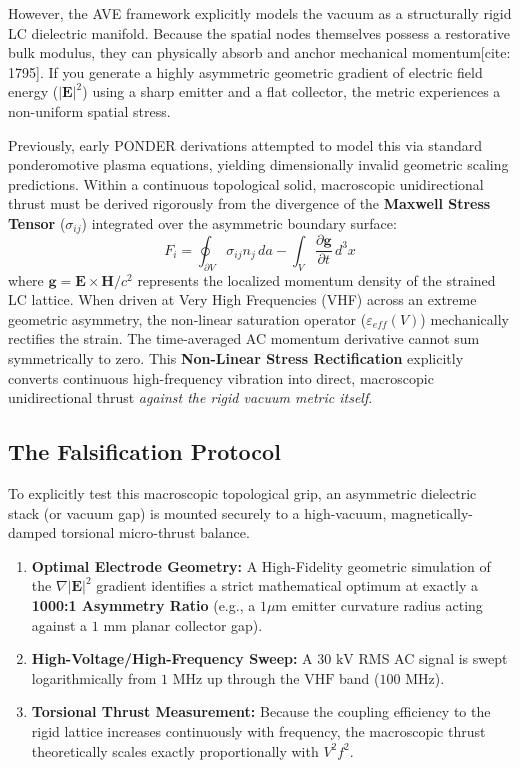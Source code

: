 However, the AVE framework explicitly models the vacuum as a structurally rigid LC dielectric manifold. Because the spatial nodes themselves possess a restorative bulk modulus, they can physically absorb and anchor mechanical momentum[cite: 1795]. If you generate a highly asymmetric geometric gradient of electric field energy ($|\mathbf{E}|^2$) using a sharp emitter and a flat collector, the metric experiences a non-uniform spatial stress.

Previously, early PONDER derivations attempted to model this via standard ponderomotive plasma equations, yielding dimensionally invalid geometric scaling predictions. Within a continuous topological solid, macroscopic unidirectional thrust must be derived rigorously from the divergence of the \textbf{Maxwell Stress Tensor} ($\sigma_{ij}$) integrated over the asymmetric boundary surface:
\begin{equation}
    F_i = \oint_{\partial V} \sigma_{ij} n_j \, da - \int_V \frac{\partial \mathbf{g}}{\partial t} \, d^3x
\end{equation}
where $\mathbf{g} = \mathbf{E} \times \mathbf{H} / c^2$ represents the localized momentum density of the strained LC lattice. When driven at Very High Frequencies (VHF) across an extreme geometric asymmetry, the non-linear saturation operator ($\varepsilon_{eff}(V)$) mechanically rectifies the strain. The time-averaged AC momentum derivative cannot sum symmetrically to zero. This \textbf{Non-Linear Stress Rectification} explicitly converts continuous high-frequency vibration into direct, macroscopic unidirectional thrust \textit{against the rigid vacuum metric itself}.

\subsection{The Falsification Protocol}
To explicitly test this macroscopic topological grip, an asymmetric dielectric stack (or vacuum gap) is mounted securely to a high-vacuum, magnetically-damped torsional micro-thrust balance.
\begin{enumerate}
    \item \textbf{Optimal Electrode Geometry:} A High-Fidelity geometric simulation of the $\nabla |\mathbf{E}|^2$ gradient identifies a strict mathematical optimum at exactly a \textbf{1000:1 Asymmetry Ratio} (e.g., a $1 \mu\text{m}$ emitter curvature radius acting against a $1 \text{ mm}$ planar collector gap).
    \item \textbf{High-Voltage/High-Frequency Sweep:} A $30 \text{ kV}$ RMS AC signal is swept logarithmically from $1 \text{ MHz}$ up through the $\text{VHF}$ band ($100 \text{ MHz}$).
    \item \textbf{Torsional Thrust Measurement:} Because the coupling efficiency to the rigid lattice increases continuously with frequency, the macroscopic thrust theoretically scales exactly proportionally with $V^2 f^2$.
\end{enumerate}

